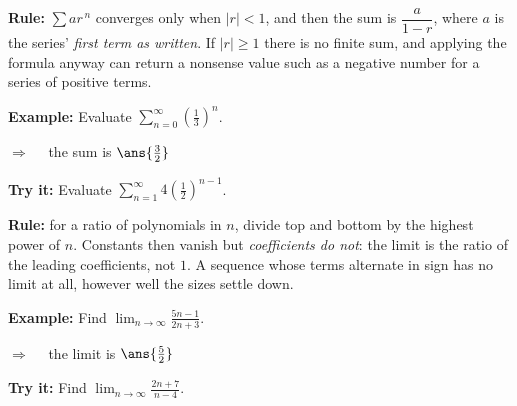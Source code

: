 \documentclass[12pt]{article}
\begin{document}

\begin{formulabox}
\textbf{Rule:} $\displaystyle\sum a r^{\,n}$ converges only when $|r| < 1$, and then the sum is
$\dfrac{a}{1-r}$, where $a$ is the series' \emph{first term as written}. If $|r| \ge 1$ there
is no finite sum, and applying the formula anyway can return a nonsense value such as a
negative number for a series of positive terms.
\end{formulabox}

\begin{examplebox}
\textbf{Example:} \quad Evaluate $\displaystyle\sum_{n=0}^{\infty} \left(\tfrac{1}{3}\right)^{n}$.

$\Rightarrow\quad$ the sum is $\ans{\tfrac{3}{2}}$
\end{examplebox}

\begin{tryitbox}
\textbf{Try it:} \quad Evaluate $\displaystyle\sum_{n=1}^{\infty} 4\left(\tfrac{1}{2}\right)^{n-1}$.\\[2pt]
\end{tryitbox}


\begin{formulabox}
\textbf{Rule:} for a ratio of polynomials in $n$, divide top and bottom by the highest power of
$n$. Constants then vanish but \emph{coefficients do not}: the limit is the ratio of the
leading coefficients, not $1$. A sequence whose terms alternate in sign has no limit at all,
however well the sizes settle down.
\end{formulabox}

\begin{examplebox}
\textbf{Example:} \quad Find $\displaystyle\lim_{n \to \infty} \frac{5n - 1}{2n + 3}$.

$\Rightarrow\quad$ the limit is $\ans{\tfrac{5}{2}}$
\end{examplebox}

\begin{tryitbox}
\textbf{Try it:} \quad Find $\displaystyle\lim_{n \to \infty} \frac{2n + 7}{n - 4}$.\\[2pt]
\end{tryitbox}
\end{document}
